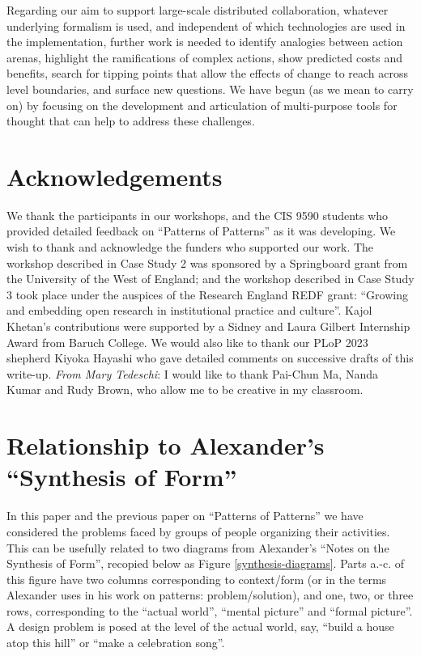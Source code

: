 \documentclass[acmlarge,timestamp]{acmart}
\begin{document}
Regarding our aim to support large-scale distributed collaboration,
whatever underlying formalism is used, and independent of which
technologies are used in the implementation, further work is needed to
identify analogies between action arenas, highlight the ramifications
of complex actions, show predicted costs and benefits, search for
tipping points that allow the effects of change to reach across level
boundaries, and surface new questions.  We have begun (as we mean to
carry on) by focusing on the development and articulation of
multi-purpose tools for thought that can help to address these
challenges.

\section*{Acknowledgements}
We thank the participants in our workshops, and the CIS 9590 students
who provided detailed feedback on “Patterns of Patterns” as it was
developing.  We wish to thank and acknowledge the funders who
supported our work.  The workshop described in Case Study 2 was
sponsored by a Springboard grant from the University of the West of
England; and the workshop described in Case Study 3 took place under
the auspices of the Research England REDF grant: “Growing and
embedding open research in institutional practice and culture”.  Kajol
Khetan’s contributions were supported by a Sidney and Laura Gilbert
Internship Award from Baruch College.  We would also like to thank our
PLoP 2023 shepherd Kiyoka Hayashi who gave detailed comments on
successive drafts of this write-up.  \textit{From Mary Tedeschi}: I
would like to thank Pai-Chun Ma, Nanda Kumar and Rudy Brown, who allow
me to be creative in my classroom.

\renewcommand\bibname{References}
\renewcommand\refname{References}




\appendix
\renewcommand\thefigure{\thesection.\arabic{figure}}

\setcounter{figure}{0}
\section{Relationship to Alexander’s “Synthesis of Form”\label{synthesis-of-form}}
In this paper and the previous paper on “Patterns of Patterns” we have
considered the problems faced by groups of people organizing their
activities.  This can be usefully related to two diagrams from
Alexander's ``Notes on the Synthesis of Form'', recopied below as
Figure \ref{synthesis-diagrams}.  Parts a.-c. of this figure have two
columns corresponding to context/form (or in the terms Alexander uses
in his work on patterns: problem/solution), and one, two, or three
rows, corresponding to the ``actual world'', ``mental picture'' and
``formal picture''.  A design problem is posed at the level of the
actual world, say, ``build a house atop this hill'' or ``make a
celebration song''.
\end{document}
